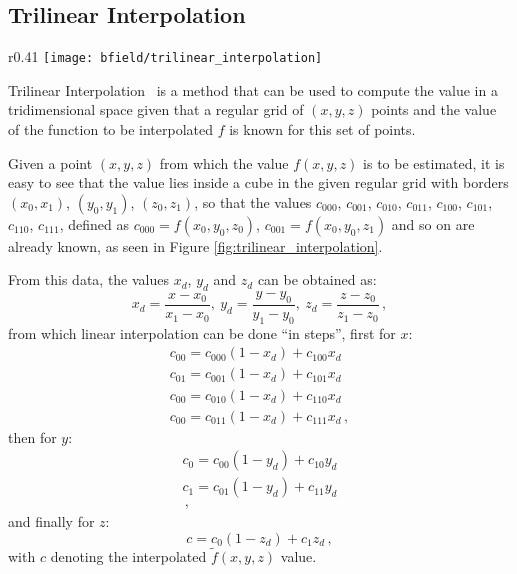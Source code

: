 \subsection{Trilinear Interpolation} \label{add:trilinear_interpolation}

    \begin{wrapfigure}{r}{0.41\textwidth}
        \centering
        \texttt{[image: bfield/trilinear\_interpolation]}
        \caption{\label{fig:trilinear_interpolation} Trilinear interpolation visual interpretation.}
    \end{wrapfigure}

Trilinear Interpolation~\cite{bourke1999interpolation} is a method that can be used to compute the value in a tridimensional space given that a regular grid of $(x,y,z)$ points and the value of the function to be interpolated $f$ is known for this set of points.

Given a point $(x,y,z)$ from which the value $f(x,y,z)$ is to be estimated, it is easy to see that the value lies inside a cube in the given regular grid with borders $(x_0, x_1)$, $(y_0, y_1)$, $(z_0, z_1)$, so that the values $c_{000}$, $c_{001}$, $c_{010}$, $c_{011}$, $c_{100}$, $c_{101}$, $c_{110}$, $c_{111}$, defined as $c_{000} = f(x_0, y_0, z_0)$, $c_{001} = f(x_0, y_0, z_1)$ and so on are already known, as seen in Figure \ref{fig:trilinear_interpolation}.

From this data, the values $x_d$, $y_d$ and $z_d$ can be obtained as:
    \begin{equation*}
        x_d = \frac{x - x_0}{x_1 - x_0},~ y_d = \frac{y - y_0}{y_1 - y_0},~ z_d = \frac{z - z_0}{z_1 - z_0}\,,
    \end{equation*}
from which linear interpolation can be done ``in steps'', first for $x$:
    \begin{align*}
        c_{00} = c_{000}(1 - x_d) + c_{100}x_d\\
        c_{01} = c_{001}(1 - x_d) + c_{101}x_d\\
        c_{00} = c_{010}(1 - x_d) + c_{110}x_d\\
        c_{00} = c_{011}(1 - x_d) + c_{111}x_d\,,
    \end{align*}
then for $y$:
    \begin{align*}
        c_0 = c_{00}(1 - y_d) + c_{10}y_d\\
        c_1 = c_{01}(1 - y_d) + c_{11}y_d\\\,,
    \end{align*}
and finally for $z$:
    \begin{equation*}
        c = c_0(1 - z_d) + c_1z_d\,,
    \end{equation*}
with $c$ denoting the interpolated $\tilde{f}(x,y,z)$ value.